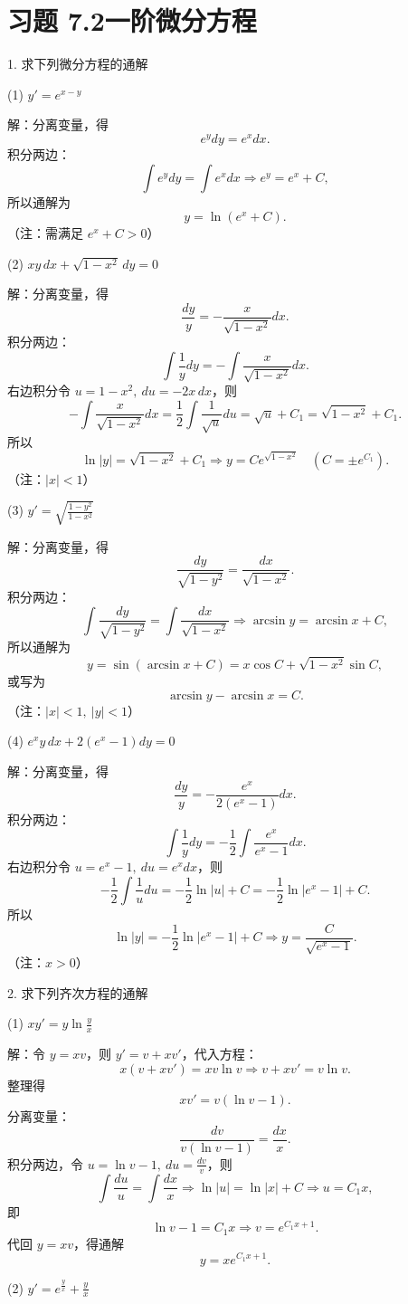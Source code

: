 \section*{习题 7.2\quad 一阶微分方程}

1. 求下列微分方程的通解

(1) \(y'=e^{x-y}\)

解：分离变量，得
\[ e^{y}dy=e^{x}dx. \]
积分两边：
\[ \int e^{y}dy=\int e^{x}dx\Rightarrow e^{y}=e^{x}+C, \]
所以通解为
\[ y=\ln(e^{x}+C). \]
（注：需满足 \(e^{x}+C>0\)）

(2) \(xy\,dx+\sqrt{1-x^{2}}\,dy=0\)

解：分离变量，得
\[ \frac{dy}{y}=-\frac{x}{\sqrt{1-x^{2}}}dx. \]
积分两边：
\[ \int\frac{1}{y}dy=-\int\frac{x}{\sqrt{1-x^{2}}}dx. \]
右边积分令 \(u=1-x^{2},\ du=-2x\,dx\)，则
\[ -\int\frac{x}{\sqrt{1-x^{2}}}dx=\frac{1}{2}\int\frac{1}{\sqrt{u}}du=\sqrt{u}+C_{1}=\sqrt{1-x^{2}}+C_{1}. \]
所以
\[ \ln|y|=\sqrt{1-x^{2}}+C_{1}\Rightarrow y=Ce^{\sqrt{1-x^{2}}}\quad(C=\pm e^{C_{1}}). \]
（注：\(|x|<1\)）

(3) \(y'=\sqrt{\frac{1-y^{2}}{1-x^{2}}}\)

解：分离变量，得
\[ \frac{dy}{\sqrt{1-y^{2}}}=\frac{dx}{\sqrt{1-x^{2}}}. \]
积分两边：
\[ \int\frac{dy}{\sqrt{1-y^{2}}}=\int\frac{dx}{\sqrt{1-x^{2}}}\Rightarrow\arcsin y=\arcsin x+C, \]
所以通解为
\[ y=\sin(\arcsin x+C)=x\cos C+\sqrt{1-x^{2}}\sin C, \]
或写为
\[ \arcsin y-\arcsin x=C. \]
（注：\(|x|<1,\ |y|<1\)）

(4) \(e^{x}y\,dx+2(e^{x}-1)dy=0\)

解：分离变量，得
\[ \frac{dy}{y}=-\frac{e^{x}}{2(e^{x}-1)}dx. \]
积分两边：
\[ \int\frac{1}{y}dy=-\frac{1}{2}\int\frac{e^{x}}{e^{x}-1}dx. \]
右边积分令 \(u=e^{x}-1,\ du=e^{x}dx\)，则
\[ -\frac{1}{2}\int\frac{1}{u}du=-\frac{1}{2}\ln|u|+C=-\frac{1}{2}\ln|e^{x}-1|+C. \]
所以
\[ \ln|y|=-\frac{1}{2}\ln|e^{x}-1|+C\Rightarrow y=\frac{C}{\sqrt{e^{x}-1}}. \]
（注：\(x>0\)）

2. 求下列齐次方程的通解

(1) \(xy'=y\ln\frac{y}{x}\)

解：令 \(y=xv\)，则 \(y'=v+xv'\)，代入方程：
\[ x(v+xv')=xv\ln v\Rightarrow v+xv'=v\ln v. \]
整理得
\[ xv'=v(\ln v-1). \]
分离变量：
\[ \frac{dv}{v(\ln v-1)}=\frac{dx}{x}. \]
积分两边，令 \(u=\ln v-1,\ du=\frac{dv}{v}\)，则
\[ \int\frac{du}{u}=\int\frac{dx}{x}\Rightarrow\ln|u|=\ln|x|+C\Rightarrow u=C_{1}x, \]
即
\[ \ln v-1=C_{1}x\Rightarrow v=e^{C_{1}x+1}. \]
代回 \(y=xv\)，得通解
\[ y=xe^{C_{1}x+1}. \]

(2) \(y'=e^{\frac{y}{x}}+\frac{y}{x}\)

